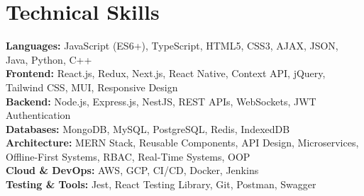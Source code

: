 \section{Technical Skills}
\vspace{2pt}

\begin{itemize}[leftmargin=0.15in, label={}]
\small{\item{

\textbf{Languages:} JavaScript (ES6+), TypeScript, HTML5, CSS3, AJAX, JSON, Java, Python, C++ \\[4pt]

\textbf{Frontend:} React.js, Redux, Next.js, React Native, Context API, jQuery, Tailwind CSS, MUI, Responsive Design \\[4pt]

\textbf{Backend:} Node.js, Express.js, NestJS, REST APIs, WebSockets, JWT Authentication \\[4pt]

\textbf{Databases:} MongoDB, MySQL, PostgreSQL, Redis, IndexedDB \\[4pt]

\textbf{Architecture:} MERN Stack, Reusable Components, API Design, Microservices, Offline-First Systems, RBAC, Real-Time Systems, OOP \\[4pt]

\textbf{Cloud \& DevOps:} AWS, GCP, CI/CD, Docker, Jenkins \\[4pt]

\textbf{Testing \& Tools:} Jest, React Testing Library, Git, Postman, Swagger

}}
\end{itemize}
